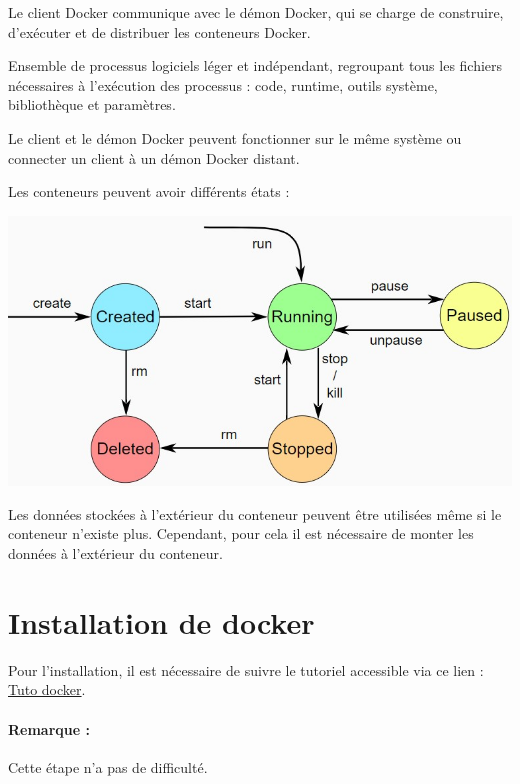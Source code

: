 \documentclass[french, 12pt]{article}%
\newcommand{\titreencadre}{Titre}
\newenvironment{encadre}[1]{\renewcommand{\titreencadre}{#1}
	\begin{mdframed}[style=encadrestyle]
	\vspace{0.5\baselineskip}
	}{%
	\end{mdframed}}
\begin{document}
Le client Docker communique avec le démon Docker, qui se charge de construire, d'exécuter et de distribuer les conteneurs Docker. 


\begin{encadre}{Container}
Ensemble de processus logiciels léger et indépendant, regroupant tous les fichiers nécessaires à l’exécution des processus : code, runtime, outils système, bibliothèque et paramètres.
\end{encadre}

Le client et le démon Docker peuvent fonctionner sur le même système ou connecter un client à un démon Docker distant. 

 Les conteneurs peuvent avoir différents états : 
 
 \begin{center}
 \includegraphics[scale=0.7]{./ressource/docker_etat}
 \end{center}

Les données stockées à l'extérieur du conteneur peuvent être utilisées même si le conteneur n'existe plus. Cependant, pour cela il est nécessaire de monter les données à l'extérieur du conteneur.


\section{Installation de docker }

Pour l'installation, il est nécessaire de suivre le tutoriel accessible via ce lien : \href{https://practicalprogramming.fr/install-docker-windows/}{Tuto docker}.

\paragraph{Remarque : } Cette étape n'a pas de difficulté. 
\end{document}
